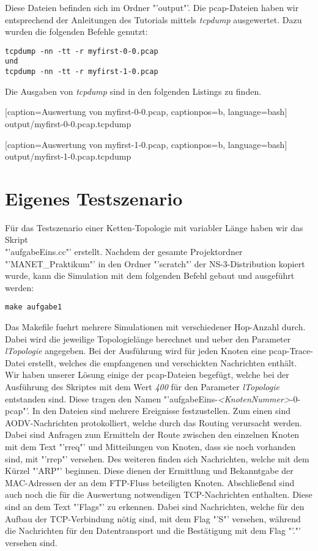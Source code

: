 \documentclass[12pt,a4paper,titlepage]{article}
\begin{document}
Diese Dateien befinden sich im Ordner "'output"'. Die pcap-Dateien haben wir entsprechend der Anleitungen des Tutorials mittels \textit{tcpdump} ausgewertet. Dazu wurden die folgenden Befehle genutzt:

\begin{lstlisting}
tcpdump -nn -tt -r myfirst-0-0.pcap
und
tcpdump -nn -tt -r myfirst-1-0.pcap
\end{lstlisting}

Die Ausgaben von \textit{tcpdump} sind in den folgenden Listings zu finden.


	[caption={Auswertung von myfirst-0-0.pcap}\label{lst:myfirst_1_pcap},
		captionpos=b,
		language=bash] %
	{output/myfirst-0-0.pcap.tcpdump}


	[caption={Auswertung von myfirst-1-0.pcap}\label{lst:myfirst_2_pcap},
		captionpos=b,
		language=bash] %
	{output/myfirst-1-0.pcap.tcpdump}

\section{Eigenes Testszenario}

Für das Testszenario einer Ketten-Topologie mit variabler Länge haben wir das Skript\\ "'aufgabeEins.cc"' erstellt. Nachdem der gesamte Projektordner "'MANET\_Praktikum"' in den Ordner "'scratch"' der NS-3-Distribution kopiert wurde, kann die Simulation mit dem folgenden Befehl gebaut und ausgeführt werden:

\begin{lstlisting}
make aufgabe1
\end{lstlisting}

Das Makefile fuehrt mehrere Simulationen mit verschiedener Hop-Anzahl durch. Dabei wird die jeweilige Topologielänge berechnet und ueber den Parameter \textit{lTopologie} angegeben. Bei der Ausführung wird für jeden Knoten eine pcap-Trace-Datei erstellt, welches die empfangenen und verschickten Nachrichten enthält. Wir haben unserer Lösung einige der pcap-Dateien begefügt, welche bei der Ausführung des Skriptes mit dem Wert \textit{400} für den Parameter \textit{lTopologie} entstanden sind. Diese tragen den Namen "'aufgabeEins-\textit{\textless KnotenNummer\textgreater}-0-pcap"'. 
In den Dateien sind mehrere Ereignisse festzustellen. Zum einen sind AODV-Nachrichten protokolliert, welche durch das Routing verursacht werden. Dabei sind Anfragen zum Ermitteln der Route zwischen den einzelnen Knoten mit dem Text "'rreq"'  und Mitteilungen von Knoten, dass sie noch vorhanden sind, mit "'rrep"' versehen. 
Des weiteren finden sich Nachrichten, welche mit dem Kürzel "'ARP"' beginnen. Diese dienen der Ermittlung und Bekanntgabe der MAC-Adressen der an dem FTP-Fluss beteiligten Knoten. Abschließend sind auch noch die für die Auswertung notwendigen TCP-Nachrichten enthalten. Diese sind an dem Text "'Flags"' zu erkennen. Dabei sind Nachrichten, welche für den Aufbau der TCP-Verbindung nötig sind, mit dem Flag "'S"' versehen, während die Nachrichten für den Datentransport und die Bestätigung mit dem Flag "'."' versehen sind.
\end{document}
